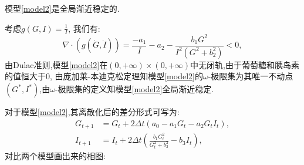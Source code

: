\begin{prop}
    模型\ref{model2}是全局渐近稳定的. 
\end{prop}
\begin{pf}
    考虑$g(G,I)=\frac{1}{I}$, 我们有:
    \begin{equation}
        \nabla\cdot(g(\dot{G},\dot{I}))=\frac{-a_1}{I}-a_2-\frac{b_1 G^2}{I^2(G^2 + b_2^2)}<0,
    \end{equation}
    由Dulac准则,模型\ref{model2}在$(0,+\infty)\times (0,+\infty)$中无闭轨,由于葡萄糖和胰岛素的值恒大于$0$, 由庞加莱-本迪克松定理知模型\ref{model2}的$\omega$-极限集为其唯一不动点$(G^*,I^*)$,由$\omega$-极限集的定义知模型\ref{model2}全局渐近稳定. 
\end{pf}
对于模型\ref{model2},其离散化后的差分形式可写为:
\begin{equation}
    \begin{aligned}
        G_{t+1} & = G_t + 2\Delta t(a_0-a_1G_t-a_2G_tI_t),  \\
        I_{t+1} & = I_t + 2\Delta t(\frac{b_1 G_t^2}{G_t^2 + b_2^2} - b_3 I_t),
    \end{aligned}
\end{equation}
对比两个模型画出来的相图:
